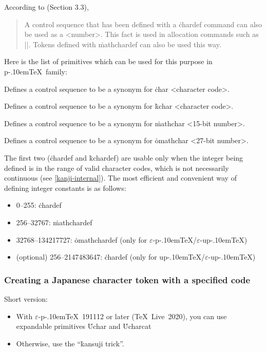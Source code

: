 \documentclass[a4paper,11pt]{article}
\def\epTeX{$\varepsilon$-\pTeX}\def\eTeX{$\varepsilon$-\TeX}
\def\eupTeX{$\varepsilon$-\upTeX}\def\upTeX{u\pTeX}
\def\pTeX{p\kern-.10em\TeX}
\def\TL{\TeX\ Live\ }
\begin{document}
According to \cite{topic} (Section 3.3),
\begin{quote}
A control sequence that has been defined with a \.{chardef} command
can also be used as a <number>.
This fact is used in allocation commands such as |\newbox|.
Tokens defined with \.{mathchardef} can also be used this way.
\end{quote}
Here is the list of primitives which can be used for this purpose
in \pTeX\ family:
\begin{simplelist}
 \csitem[\.{chardef} <control sequence>=<character code>]
  Defines a control sequence to be a synonym for
  \.{char} <character code>.

 \csitem[\.{kchardef} <control sequence>=<character code> (for \upTeX/\eupTeX)]
  Defines a control sequence to be a synonym for
  \.{kchar} <character code>.

 \csitem[\.{mathchardef} <control sequence>=<15-bit number>]
  Defines a control sequence to be a synonym for
  \.{mathchar} <15-bit number>.

 \csitem[\.{omathchardef} <control sequence>=<27-bit number> (for \epTeX/\eupTeX)]
  Defines a control sequence to be a synonym for
  \.{omathchar} <27-bit number>.
\end{simplelist}

The first two (\.{chardef} and \.{kchardef}) are usable only when
the integer being defined is in the range of valid character codes,
which is not necessarily continuous (see \ref{kanji-internal}).
The most efficient and convenient way of defining integer constants
is as follows:
\begin{itemize}
 \item 0--255: \.{chardef}
 \item 256--32767: \.{mathchardef}
 \item 32768--134217727: \.{omathchardef} (only for \epTeX/\eupTeX)
 \item (optional) 256--2147483647: \.{chardef} (only for \upTeX/\eupTeX)
\end{itemize}

\subsubsection{Creating a Japanese character token with a specified code}

Short version:
\begin{itemize}
 \item With \epTeX~191112 or later (\TL2020),
   you can use expandable primitives \.{Uchar} and \.{Ucharcat}
 \item Otherwise, use the ``\.{kansuji} trick''.
\end{itemize}
\end{document}
